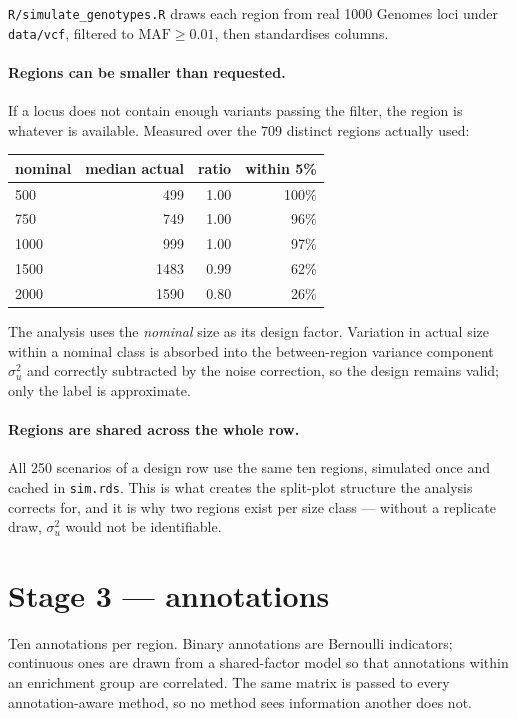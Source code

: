 \documentclass[11pt,a4paper]{article}
\newcommand{\file}[1]{\texttt{\small #1}}
\begin{document}
\file{R/simulate\_genotypes.R} draws each region from real 1000 Genomes loci
under \file{data/vcf}, filtered to $\mathrm{MAF}\ge0.01$, then standardises
columns.

\paragraph{Regions can be smaller than requested.} If a locus does not contain
enough variants passing the filter, the region is whatever is available. Measured
over the 709 distinct regions actually used:

\begin{center}\small
\begin{tabular}{lrrr}\toprule
nominal & median actual & ratio & within 5\%\\\midrule
500 & 499 & 1.00 & 100\%\\
750 & 749 & 1.00 & 96\%\\
1000 & 999 & 1.00 & 97\%\\
1500 & 1483 & 0.99 & 62\%\\
2000 & 1590 & 0.80 & 26\%\\
\bottomrule\end{tabular}\end{center}

The analysis uses the \emph{nominal} size as its design factor. Variation in
actual size within a nominal class is absorbed into the between-region variance
component $\sigma^2_u$ and correctly subtracted by the noise correction, so the
design remains valid; only the label is approximate.

\paragraph{Regions are shared across the whole row.} All 250 scenarios of a
design row use the same ten regions, simulated once and cached in \file{sim.rds}.
This is what creates the split-plot structure the analysis corrects for, and it
is why two regions exist per size class --- without a replicate draw, $\sigma^2_u$
would not be identifiable.

\section{Stage 3 --- annotations}

Ten annotations per region. Binary annotations are Bernoulli indicators;
continuous ones are drawn from a shared-factor model so that annotations within
an enrichment group are correlated. The same matrix is passed to every
annotation-aware method, so no method sees information another does not.
\end{document}
